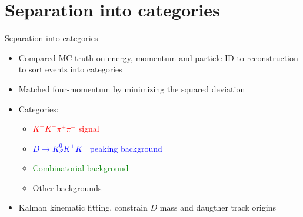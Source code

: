 \documentclass{beamer}
\begin{document}
\section{Separation into categories}
\begin{frame}{Separation into categories}
  \begin{itemize}
    \item{Compared MC truth on energy, momentum and particle ID to reconstruction to sort events into categories}
    \item{Matched four-momentum by minimizing the squared deviation}
    \item{Categories:}
    \begin{itemize}
      \item{\textcolor{red}{$K^+K^-\pi^+\pi^-$ signal}}
      \item{\textcolor{blue}{$D\to K_S^0K^+K^-$ peaking background}}
      \item{\textcolor{green}{Combinatorial background}}
      \item{Other backgrounds}
    \end{itemize}
    \item{Kalman kinematic fitting, constrain $D$ mass and daugther track origins}
  \end{itemize}
\end{frame}
\end{document}
